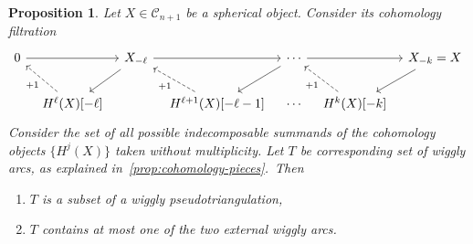 \documentclass{amsart}
\newtheorem{proposition}[theorem]{Proposition}
\theoremstyle{definition}
\begin{document}
\begin{proposition}
\label{prop:hn-filtration}
  Let \(X \in \mathcal{C}_{n+1}\) be a spherical object.
  Consider its cohomology filtration
  \[
    \begin{tikzcd}[column sep=0.3cm]
      0 \arrow{rr} && X_{-\ell} \arrow{dl} \arrow{rr} && \cdots \arrow{rr} \arrow{dl} && X_{-k} = X \arrow{dl}\\
      & H^\ell(X)[-\ell] \arrow[dashed]{ul}{+1} && H^{\ell+1}(X)[-\ell-1] \arrow[dashed]{ul}{+1} & \cdots & H^k(X)[-k] \arrow[dashed]{ul}{+1}
    \end{tikzcd}
  \]
  Consider the set of all possible indecomposable summands of the cohomology objects \(\{H^j(X)\}\) taken without multiplicity.
  Let \(T\) be corresponding set of wiggly arcs, as explained in~\cref{prop:cohomology-pieces}.~Then
  \begin{enumerate}
  \item 
    \(T\) is a subset of a wiggly pseudotriangulation,
  \item \(T\) contains at most one of the two external wiggly arcs.
  \end{enumerate}
\end{proposition}
\end{document}
